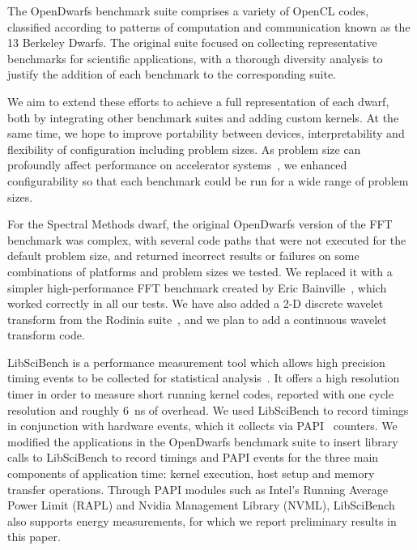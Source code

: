 \documentclass[../document.tex]{subfiles}
\begin{document}
\label{sec:extending_the_opendwarfs_benchmark_suite}

The OpenDwarfs benchmark suite comprises a variety of OpenCL codes, classified according to patterns of computation and communication known as the 13 Berkeley Dwarfs.\cite{asanovic2006landscape}
The original suite focused on collecting representative benchmarks for scientific applications, with a thorough diversity analysis to justify the addition of each benchmark to the corresponding suite.

We aim to extend these efforts to achieve a full representation of each dwarf, both by integrating other benchmark suites and adding custom kernels.
At the same time, we hope to improve portability between devices, interpretability and flexibility of configuration including problem sizes.
As problem size can profoundly affect performance on accelerator systems~\cite{marjanovic2016hpc}, we enhanced configurability so that each benchmark could be run for a wide range of problem sizes.

For the Spectral Methods dwarf, the original OpenDwarfs version of the FFT benchmark was complex, with several code paths that were not executed for the default problem size, and returned incorrect results or failures on some combinations of platforms and problem sizes we tested.
We replaced it with a simpler high-performance FFT benchmark created by Eric Bainville~\cite{bainville2010fft}, which worked correctly in all our tests.
We have also added a 2-D discrete wavelet transform from the Rodinia suite~\cite{che2009rodinia}, and we plan to add a continuous wavelet transform code.

LibSciBench is a performance measurement tool which allows high precision timing events to be collected for statistical analysis~\cite{hoefler2015scientific}.
It offers a high resolution timer in order to measure short running kernel codes, reported with one cycle resolution and roughly \SI{6}{\nano\second} of overhead.
We used LibSciBench to record timings in conjunction with hardware events, which it collects via PAPI~\cite{mucci1999papi} counters.
We modified the applications in the OpenDwarfs benchmark suite to insert library calls to LibSciBench to record timings and PAPI events for the three main components of application time: kernel execution, host setup and memory transfer operations.
Through PAPI modules such as Intel's Running Average Power Limit (RAPL) and Nvidia Management Library (NVML), LibSciBench also supports energy measurements, for which we report preliminary results in this paper.
\end{document}
